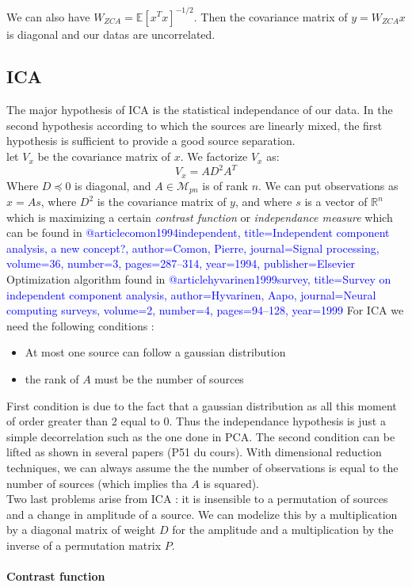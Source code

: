 \documentclass[a4paper,11pt,titlepage]{article}
\begin{document}
We can also have $W_{ZCA} = \mathds{E}[x^Tx]^{-1/2}$. Then the covariance matrix of $y = W_{ZCA}x$ is diagonal and our datas are uncorrelated. 
\subsection{ICA}
The major hypothesis of ICA is the statistical independance of our data. In the second hypothesis according to which the sources are linearly mixed, the first hypothesis is sufficient to provide a good source separation. \\
let $V_x$ be the covariance matrix of $x$. We factorize $V_x$ as:
\begin{equation*}
	V_x = AD^2A^T
\end{equation*}
Where $D \preccurlyeq 0$ is diagonal, and $A \in \mathcal{M}_{pn}$ is of rank $n$. We can put observations as $x = As$, where $D^2$ is the covariance matrix of $y$, and where $s$ is a vector of $\mathds{R}^n$ which is maximizing a certain \textit{contrast function} or \textit{independance measure} which can be found in \textcolor{blue}{@article{comon1994independent,
  title={Independent component analysis, a new concept?},
    author={Comon, Pierre},
  journal={Signal processing},
    volume={36},
  number={3},
    pages={287--314},
  year={1994},
    publisher={Elsevier}
}}
\\
Optimization algorithm found in \textcolor{blue}{@article{hyvarinen1999survey,
	  title={Survey on independent component analysis},
	    author={Hyvarinen, Aapo},
		  journal={Neural computing surveys},
		    volume={2},
			  number={4},
			    pages={94--128},
				  year={1999}
			  }}
For ICA we need the following conditions :
\begin{itemize}
	\item At most one source can follow a gaussian distribution
	\item the rank of $A$ must be the number of sources
\end{itemize}
First condition is due to the fact that a gaussian distribution as all this moment of order greater than 2 equal to 0. Thus the independance hypothesis is just a simple decorrelation such as the one done in PCA. The second condition can be lifted as shown in several papers (P51 du cours).
With dimensional reduction techniques, we can always assume the the number of observations is equal to the number of sources (which implies tha $A$ is squared). 
\\
Two last problems arise from ICA : it is insensible to a permutation of sources and a change in amplitude of a source. We can modelize this by a multiplication by a diagonal matrix of weight $D$ for the amplitude and a multiplication by the inverse of a permutation matrix $P$.

\paragraph{Contrast function}
\end{document}
